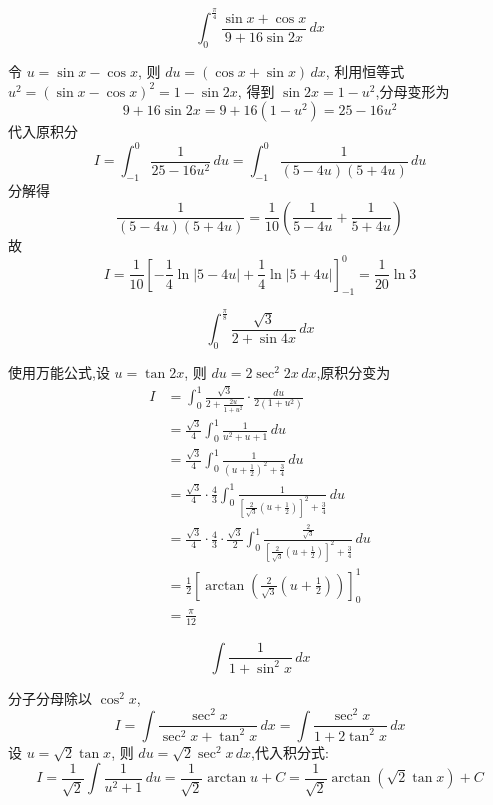 \begin{questions}
    \question 
    \[
    \int_{0}^{\frac{\pi}{4}} \frac{\sin x+\cos x}{9+16\sin 2x} \,dx
    \]
    \begin{solution}
        令 $u = \sin x - \cos x$, 则 $du = (\cos x + \sin x) \,dx$,
        利用恒等式 $u^2 = (\sin x - \cos x)^2 = 1 - \sin 2x$, 得到 $\sin 2x = 1 - u^2$,分母变形为
        \[
        9 + 16\sin 2x = 9 + 16(1 - u^2) = 25 - 16u^2
        \]
        代入原积分
        \[
        I = \int_{-1}^{0} \frac{1}{25 - 16u^2} \,du = \int_{-1}^{0} \frac{1}{(5-4u)(5+4u)} \,du
        \]
        分解得
        \[
        \frac{1}{(5-4u)(5+4u)} = \frac{1}{10} \left( \frac{1}{5-4u} + \frac{1}{5+4u} \right)
        \]
        故
        \[
        I = \frac{1}{10} \left[ -\frac{1}{4} \ln|5-4u| + \frac{1}{4} \ln|5+4u| \right]_{-1}^{0} = \frac{1}{20} \ln 3
        \]
    \end{solution}

    \question 
    \[
    \int_{0}^{\frac{\pi}{8}} \frac{\sqrt{3}}{2+\sin 4x} \,dx
    \]
    \begin{solution}
        使用万能公式,设 $u = \tan 2x$, 则 $du = 2\sec^2 2x \,dx$,原积分变为
        \begin{align*}
        I &= \int_{0}^{1} \frac{\sqrt{3}}{2 + \frac{2u}{1+u^2}} \cdot \frac{du}{2(1+u^2)} \\
        &= \frac{\sqrt{3}}{4} \int_{0}^{1} \frac{1}{u^2 + u + 1} \,du \\
        &= \frac{\sqrt{3}}{4} \int_{0}^{1} \frac{1}{(u+\frac{1}{2})^2 + \frac{3}{4}} \,du \\
        &= \frac{\sqrt{3}}{4} \cdot \frac{4}{3} \int_{0}^{1} \frac{1}{\left[\frac{2}{\sqrt{3}}(u+\frac{1}{2})\right]^2 + \frac{3}{4}} \,du \\
        &= \frac{\sqrt{3}}{4} \cdot \frac{4}{3} \cdot \frac{\sqrt{3}}{2} \int_{0}^{1} \frac{\frac{2}{\sqrt{3}}}{\left[\frac{2}{\sqrt{3}}\left(u+\frac{1}{2}\right)\right]^2 + \frac{3}{4}} \,du \\
        &= \frac{1}{2} \left[\arctan\left(\frac{2}{\sqrt{3}}\left(u+\frac{1}{2}\right)\right)\right]_{0}^{1} \\
        &= \frac{\pi}{12}
        \end{align*}
    \end{solution}

    \question
    \[
    \int \frac{1}{1 + \sin^2 x} \,dx
    \]
    \begin{solution}
        分子分母除以 $\cos^2 x$,
        \[
        I = \int \frac{\sec^2 x}{\sec^2 x + \tan^2 x} \,dx = \int \frac{\sec^2 x}{1 + 2\tan^2 x} \,dx
        \]
        设 $u = \sqrt{2} \tan x$, 则 $du = \sqrt{2} \sec^2 x \,dx$,代入积分式:
        \[
        I = \frac{1}{\sqrt{2}} \int \frac{1}{u^2+1} \,du = \frac{1}{\sqrt{2}} \arctan u + C = \frac{1}{\sqrt{2}} \arctan(\sqrt{2} \tan x) + C
        \]
    \end{solution}


\end{questions}
